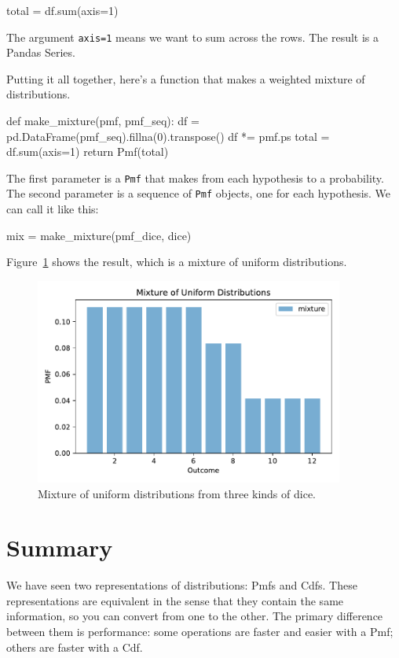 \documentclass[12pt]{book}
\theoremstyle{exercise}
\newcommand{\py}[1]{{\tt #1}}%
\begin{document}
\begin{code}
total = df.sum(axis=1)
\end{code}

The argument \py{axis=1} means we want to sum across the rows.
The result is a Pandas Series.

Putting it all together, here's a function that makes a weighted mixture of distributions.

\begin{code}
def make_mixture(pmf, pmf_seq):
    df = pd.DataFrame(pmf_seq).fillna(0).transpose()
    df *= pmf.ps
    total = df.sum(axis=1)
    return Pmf(total)
\end{code}


The first parameter is a \py{Pmf} that makes from each hypothesis to a probability.
The second parameter is a sequence of \py{Pmf} objects, one for each hypothesis.
We can call it like this:

\begin{code}
mix = make_mixture(pmf_dice, dice)
\end{code}

Figure~\ref{fig06-04} shows the result, which is a mixture of uniform distributions.

\begin{figure}
\centerline{\includegraphics[width=4in]{figs/fig06-04.pdf}}
\caption{Mixture of uniform distributions from three kinds of dice.}
\label{fig06-04}
\end{figure}



\section{Summary}


We have seen two representations of distributions: Pmfs and Cdfs.
These representations are equivalent in the sense that they contain
the same information, so you can convert from one to the other.  The
primary difference between them is performance: some operations are
faster and easier with a Pmf; others are faster with a Cdf.
 
\end{document}
